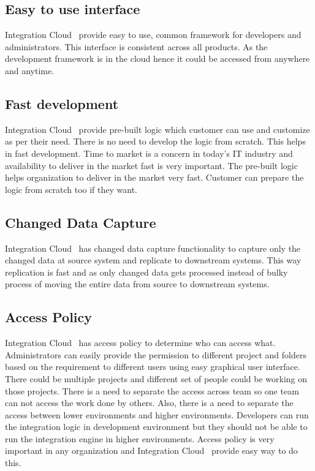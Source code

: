 \subsection{Easy to use interface}
Integration Cloud~\cite{hid-sp18-511-iics} provide easy to use, common framework for developers and administrators. This interface is consistent across all products. As the development framework is in the cloud hence it could be accessed from anywhere and anytime.

\subsection{Fast development}
Integration Cloud~\cite{hid-sp18-511-iics} provide pre-built logic which customer can use and customize as per their need. There is no need to develop the logic from scratch. This helps in fast development. Time to market is a concern in today's IT industry and availability to deliver in the market fast is very important. The pre-built logic helps organization to deliver in the market very fast. Customer can prepare the logic from scratch too if they want. 

\subsection{Changed Data Capture}

Integration Cloud~\cite{hid-sp18-511-iics} has changed data capture functionality to capture only the changed data at source system and replicate to downstream systems. This way replication is fast and as only changed data gets processed instead of bulky process of moving the entire data from source to downstream systems.

\subsection{Access Policy}

Integration Cloud~\cite{hid-sp18-511-iics} has access policy to determine who can access what. Administrators can easily provide the permission to different project and folders based on the requirement to different users using easy graphical user interface. There could be multiple projects and different set of people could be working on those projects. There is a need to separate the access across team so one team can not access the work done by others. Also, there is a need to separate the access between lower environments and higher environments. Developers can run the integration logic in development environment but they should not be able to run the integration engine in higher environments. Access policy is very important in any organization and Integration Cloud~\cite{hid-sp18-511-iics} provide easy way to do this.

